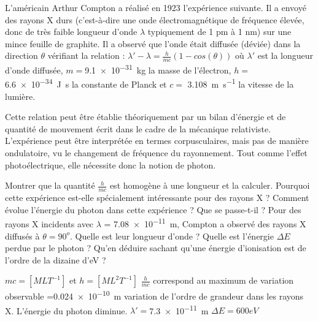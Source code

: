 \begin{Exercise}[title=Diffusion Compton]
  L’américain Arthur Compton a réalisé en 1923 l’expérience suivante. Il a envoyé des rayons X durs (c’est-à-dire une onde électromagnétique de fréquence élevée, donc de très faible longueur d’onde $\lambda$ typiquement de 1 pm à 1 nm) sur une mince feuille de graphite. Il a observé que l’onde était diffusée (déviée) dans la direction $\theta$ vérifiant la relation : $\lambda' - \lambda = \frac{h}{mc}(1-cos(\theta))$ où $\lambda'$
  est  la  longueur  d’onde  diffusée, $m =$\SI{9,1e-31}{kg}  la  masse  de l’électron, $h =$ \SI{6,6e-34}{J.s} la constante de Planck et $c =$ \SI{3.108}{\m.\s^{-1}} la vitesse de la lumière.

  Cette relation peut être établie théoriquement par un bilan d’énergie et de quantité de mouvement écrit dans le cadre de la mécanique relativiste. L’expérience peut être interprétée en termes corpusculaires, mais pas de manière ondulatoire, vu le changement de fréquence du rayonnement. Tout comme l’effet photoélectrique, elle nécessite donc la notion de photon. 

  \Question Montrer que la quantité $\frac{h}{mc}$ est homogène à une longueur et la calculer.
  \Question  Pourquoi cette expérience est-elle spécialement intéressante pour des rayons X ?
  \Question  Comment évolue l’énergie du photon dans cette expérience ? Que se passe-t-il ?
  \Question  Pour des rayons X incidents avec $\lambda$ = \SI{7,08e-11}{m}, Compton a observé des rayons X diffusés à $\theta = 90^o$. Quelle est leur longueur d’onde ?
  \Question  Quelle est l’énergie $\Delta E$ perdue par le photon ? Qu’en déduire sachant qu’une énergie d’ionisation est de l’ordre de la dizaine d'eV ?
\end{Exercise}
\begin{Answer}
  \Question $mc =[MLT^{-1}]$ et $h=[ML^2T^{-1}]$
  \Question $\frac{h}{mc}$ correspond au maximum de variation observable =\SI{0.024e-10}{m} variation de l'ordre de grandeur dans les rayons X.
  \Question L'énergie du photon diminue. 
  \Question $\lambda'=$\SI{7,3e-11}{m}
  \Question $\Delta E=600 eV$
\end{Answer}

